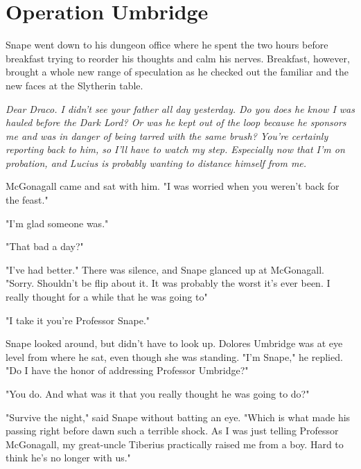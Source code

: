 
\chapter{Operation Umbridge}


Snape went down to his dungeon office where he spent the two hours before breakfast trying to reorder his thoughts and calm his nerves. Breakfast, however, brought a whole new range of speculation as he checked out the familiar and the new faces at the Slytherin table.

\emph{Dear Draco. I didn't see your father all day yesterday. Do you{\el} does he know I was hauled before the Dark Lord? Or was he kept out of the loop because he sponsors me and was in danger of being tarred with the same brush? You're certainly reporting back to him, so I'll have to watch my step. Especially now that I'm on probation, and Lucius is probably wanting to distance himself from me.}

McGonagall came and sat with him. "I was worried when you weren't back for the feast."

"I'm glad someone was."

"That bad a day?"

"I've had better." There was silence, and Snape glanced up at McGonagall. "Sorry. Shouldn't be flip about it. It was probably the worst it's ever been. I really thought for a while that he was going to{\el}"

"I take it you're Professor Snape."

Snape looked around, but didn't have to look up. Dolores Umbridge was at eye level from where he sat, even though she was standing. "I'm Snape," he replied. "Do I have the honor of addressing Professor Umbridge?"

"You do. And what was it that you really thought he was going to do?"

"Survive the night," said Snape without batting an eye. "Which is what made his passing right before dawn such a terrible shock. As I was just telling Professor McGonagall, my great-uncle Tiberius practically raised me from a boy. Hard to think he's no longer with us."

